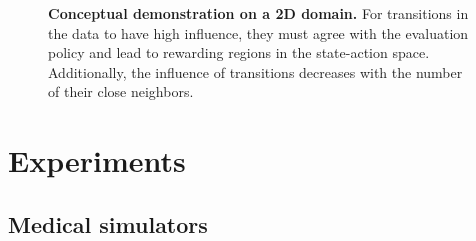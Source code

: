 \documentclass{article}
\begin{document}
\begin{figure}[t]
\centering
{}
\caption{\textbf{Conceptual demonstration on a 2D domain.} For transitions in the data to have high influence, they must agree with the evaluation policy and lead to rewarding regions in the state-action space. Additionally, the influence of transitions decreases with the number of their close neighbors.}
\label{fig:intuition}
\end{figure}


\section{Experiments}

\subsection{Medical simulators}
\end{document}

